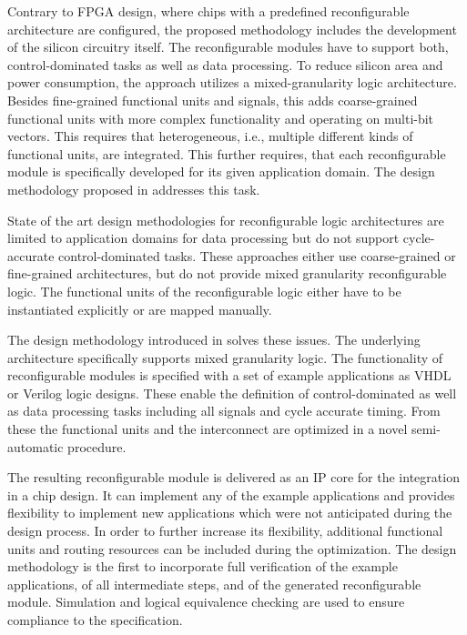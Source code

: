 \documentclass[a4paper,12pt,onsided]{article}
\begin{document}
Contrary to FPGA design, where chips with a predefined reconfigurable
architecture are configured, the proposed methodology includes the development
of the silicon circuitry itself.
The reconfigurable modules have to support both, control-dominated tasks as
well as data processing.
To reduce silicon area and power consumption, the approach utilizes a
mixed-granularity logic architecture.
Besides fine-grained functional units and signals, this adds coarse-grained
functional units with more complex functionality and operating on multi-bit
vectors.
This requires that heterogeneous, i.e., multiple different kinds of functional
units, are integrated.
This further requires, that each reconfigurable module is specifically developed
for its given application domain.
The design methodology proposed in \cite{Gla15} addresses this task.

State of the art design methodologies for reconfigurable logic architectures
are limited to application domains for data processing but do not support
cycle-accurate control-dominated tasks.
These approaches either use coarse-grained or fine-grained architectures, but
do not provide mixed granularity reconfigurable logic.
The functional units of the reconfigurable logic either have to be
instantiated explicitly or are mapped manually.

The design methodology introduced in  \cite{Gla15} solves these issues.
The underlying architecture %
specifically supports mixed
granularity logic.
The functionality of reconfigurable modules is specified with a set of example
applications as VHDL or Verilog logic designs. These enable the definition of
control-dominated as well as data processing tasks including all signals and
cycle accurate timing.
From these the functional units and the interconnect are optimized in a novel
semi-automatic procedure.

The resulting reconfigurable module is delivered as an IP core for the
integration in a chip design.
It can implement any of the example applications and provides flexibility to
implement new applications which were not anticipated during the design
process.
In order to further increase its flexibility, additional functional units and
routing resources
can be included during the optimization.
The design methodology is the first to incorporate full verification of the example
applications, of all intermediate steps, and of the generated reconfigurable
module. Simulation and logical equivalence checking are used to ensure
compliance to the specification.
                                           
\end{document}
